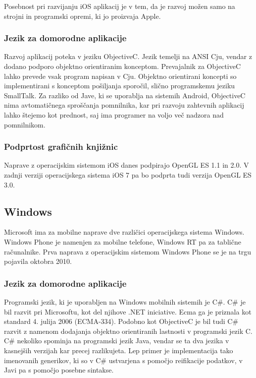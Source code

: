 Posebnost pri razvijanju iOS aplikacij je v tem, da je razvoj možen samo na strojni in programski opremi, ki jo proizvaja Apple.

\subsubsection{Jezik za domorodne aplikacije} 

Razvoj aplikacij poteka v jeziku ObjectiveC. Jezik temelji na ANSI Cju, vendar z dodano podporo objektno orientiranim konceptom. Prevajalnik za ObjectiveC lahko prevede vsak program napisan v Cju. Objektno orientirani koncepti so implementirani s konceptom pošiljanja sporočil, slično programskemu jeziku SmallTalk. Za razliko od Jave, ki se uporablja na sistemih Android, ObjectiveC nima avtomatičnega sproščanja pomnilnika, kar pri razvoju zahtevnih aplikacij lahko štejemo kot prednost, saj ima programer na voljo več nadzora nad pomnilnikom. 

\subsubsection{Podprtost grafičnih knjižnic}

Naprave z operacijskim sistemom iOS danes podpirajo OpenGL ES 1.1 in 2.0. V zadnji verziji operacijskega sistema iOS 7 pa bo podprta tudi verzija OpenGL ES 3.0.

\subsection{Windows}

% 

Microsoft ima za mobilne naprave dve različici operacijskega sistema Windows. Windows Phone \cite{winphone} je namenjen za mobilne telefone, Windows RT pa za tablične računalnike. Prva naprava z operacijskim sistemom Windows Phone se je na trgu pojavila oktobra 2010.

\subsubsection{Jezik za domorodne aplikacije}

Programski jezik, ki je uporabljen na Windows mobilnih sistemih je C\#. C\# je bil razvit pri Microsoftu, kot del njihove .NET iniciative. Ecma ga je priznala kot standard 4. julija 2006 (ECMA-334). Podobno kot ObjectiveC je bil tudi C\# razvit z namenom dodajanja objektno orientiranih lastnosti v programski jezik C. C\# nekoliko spominja na programski jezik Java, vendar se ta dva jezika v kasnejših verzijah kar precej razlikujeta. Lep primer je implementacija tako imenovanih generikov, ki so v C\# ustvarjena s pomočjo reifikacije podatkov, v Javi pa s pomočjo posebne sintakse. 

